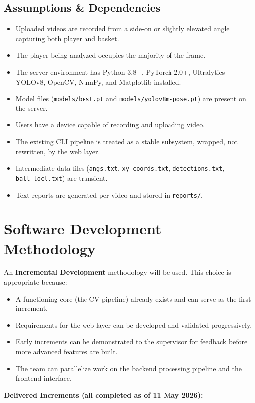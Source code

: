 ﻿\documentclass[11pt,a4paper]{article}
\begin{document}
\subsection{Assumptions \& Dependencies}
\begin{itemize}[leftmargin=*]
    \item Uploaded videos are recorded from a side-on or slightly elevated angle capturing both player and basket.
    \item The player being analyzed occupies the majority of the frame.
    \item The server environment has Python 3.8+, PyTorch 2.0+, Ultralytics YOLOv8, OpenCV, NumPy, and Matplotlib installed.
    \item Model files (\texttt{models/best.pt} and \texttt{models/yolov8m-pose.pt}) are present on the server.
    \item Users have a device capable of recording and uploading video.
    \item The existing CLI pipeline is treated as a stable subsystem, wrapped, not rewritten, by the web layer.
    \item Intermediate data files (\texttt{angs.txt}, \texttt{xy\_coords.txt}, \texttt{detections.txt}, \texttt{ball\_locl.txt}) are transient.
    \item Text reports are generated per video and stored in \texttt{reports/}.
\end{itemize}

\section{Software Development Methodology}
An \textbf{Incremental Development} methodology will be used. This choice is appropriate because:
\begin{itemize}[leftmargin=*]
    \item A functioning core (the CV pipeline) already exists and can serve as the first increment.
    \item Requirements for the web layer can be developed and validated progressively.
    \item Early increments can be demonstrated to the supervisor for feedback before more advanced features are built.
    \item The team can parallelize work on the backend processing pipeline and the frontend interface.
\end{itemize}

\textbf{Delivered Increments (all completed as of 11 May 2026):}
\end{document}
